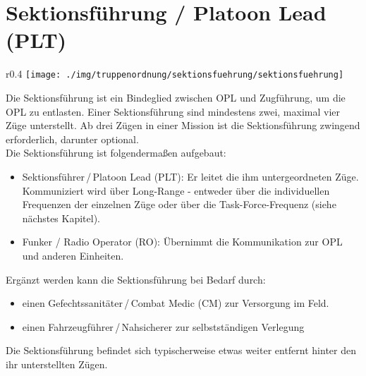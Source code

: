 \section{Sektionsführung / Platoon Lead (PLT)}
\begin{wrapfigure}{r}{0.4\textwidth}
	\vspace{-25pt}
	\centering 
	\texttt{[image: ./img/truppenordnung/sektionsfuehrung/sektionsfuehrung]}
	\vspace{-90pt}
\end{wrapfigure}	
Die Sektionsführung ist ein Bindeglied zwischen OPL und Zugführung, um die OPL zu entlasten. Einer Sektionsführung sind mindestens zwei, maximal vier Züge unterstellt. Ab drei Zügen in einer Mission ist die Sektionsführung zwingend erforderlich, darunter optional.\\

Die Sektionsführung ist folgendermaßen aufgebaut:
\begin{itemize}
	\item Sektionsführer\,/\,Platoon Lead (PLT): Er leitet die ihm untergeordneten Züge. Kommuniziert wird über Long-Range - entweder über die individuellen Frequenzen der einzelnen Züge oder über die Task-Force-Frequenz (siehe nächstes Kapitel).
	\item Funker / Radio Operator (RO): Übernimmt die Kommunikation zur OPL und anderen Einheiten.
\end{itemize}
Ergänzt werden kann die Sektionsführung bei Bedarf durch:
\begin{itemize}
	\setlength\itemsep{0em}
	\item einen Gefechtssanitäter\,/\,Combat Medic (CM) zur Versorgung im Feld.
	\item einen Fahrzeugführer\,/\,Nahsicherer zur selbstständigen Verlegung
\end{itemize} 
Die Sektionsführung befindet sich typischerweise etwas weiter entfernt hinter den ihr unterstellten Zügen.
